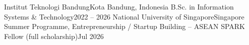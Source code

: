   \customSubHeadingContentStart
    \customSubHeading
      {Institut Teknologi Bandung}{Kota Bandung, Indonesia}
    \customRoleHeading
      {B.Sc. in Information Systems \& Technology}{2022 -- 2026}
    \vspace{-6pt}
    \customSubHeading
      {National University of Singapore}{Singapore}
    \customRoleHeading
      {Summer Programme, Entrepreneurship / Startup Building -- ASEAN SPARK Fellow (full scholarship)}{Jul 2026}
  \customSubHeadingContentEnd
\vspace{5pt}
